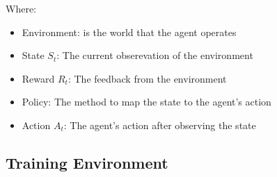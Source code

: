 \documentclass[ %
                    author={Ashwinder Khurana},
                supervisor={Prof Dave Cliff},
                    degree={MEng},
                     title={The Deeply Reinforced Trader},
                  subtitle={},
                      type={enterprise},
                      year={2020} ]{dissertation}
\begin{document}
{\noindent
Where:
\begin{itemize}
\item Environment: is the world that the agent operates 
\item State $S_t$: The current obserevation of the environment
\item Reward $R_t$: The feedback from the environment
\item Policy: The method to map the state to the agent's action 
\item Action $A_t$: The agent's action after observing the state
\end{itemize}

\vspace{0.5cm}


\subsection{Training Environment}

}
\end{document}
